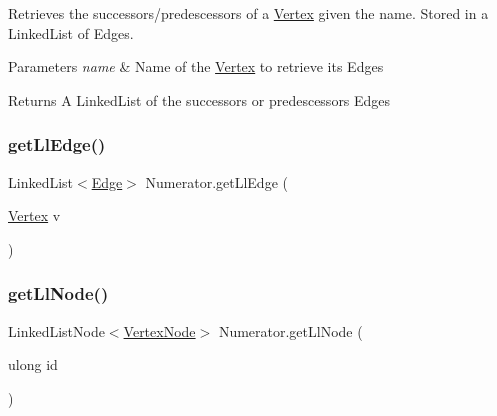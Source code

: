 Retrieves the successors/predescessors of a \hyperlink{structVertex}{Vertex} given the name. Stored in a Linked\+List of Edges. 


\begin{DoxyParams}{Parameters}
{\em name} & Name of the \hyperlink{structVertex}{Vertex} to retrieve its Edges\\
\hline
\end{DoxyParams}
\begin{DoxyReturn}{Returns}
A Linked\+List of the successors or predescessors Edges
\end{DoxyReturn}
\mbox{\label{classNumerator_ac2697483375a76133c5e8177ab228fb8}} 
\subsubsection{\texorpdfstring{get\+Ll\+Edge()}{getLlEdge()}\hspace{0.1cm}{\footnotesize\ttfamily [3/3]}}
{\footnotesize\ttfamily Linked\+List$<$\hyperlink{classEdge}{Edge}$>$ Numerator.\+get\+Ll\+Edge (\begin{DoxyParamCaption}\item[{\hyperlink{structVertex}{Vertex}}]{v }\end{DoxyParamCaption})\hspace{0.3cm}{\ttfamily [inline]}}

\mbox{\label{classNumerator_ae18456abf7a029e36e9227060e63504c}} 
\subsubsection{\texorpdfstring{get\+Ll\+Node()}{getLlNode()}\hspace{0.1cm}{\footnotesize\ttfamily [1/2]}}
{\footnotesize\ttfamily Linked\+List\+Node$<$\hyperlink{classVertexNode}{Vertex\+Node}$>$ Numerator.\+get\+Ll\+Node (\begin{DoxyParamCaption}\item[{ulong}]{id }\end{DoxyParamCaption})\hspace{0.3cm}{\ttfamily [inline]}}



